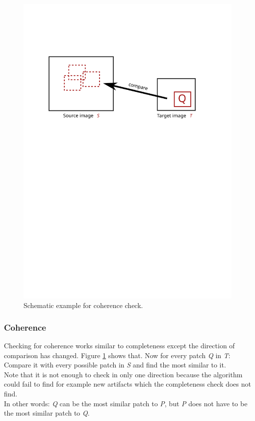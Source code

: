 \begin{figure}[h]
\centering
\includegraphics[scale=0.65]{img/coherence}
\caption[Coherence]{Schematic example for coherence check.}
\label{fig:Coherence}
\end{figure}

\subsubsection*{Coherence}

Checking for coherence works similar to completeness except the direction of comparison has changed. Figure \ref{fig:Coherence} shows that. Now for every patch \textit{Q} in \textit{T}: Compare it with every possible patch in \textit{S} and find the most similar to it.\\
Note that it is not enough to check in only one direction because the algorithm could fail to find for example new artifacts which the completeness check does not find.\\
In other words: \textit{Q} can be the most similar patch to \textit{P}, but \textit{P} does not have to be the most similar patch to \textit{Q}.

